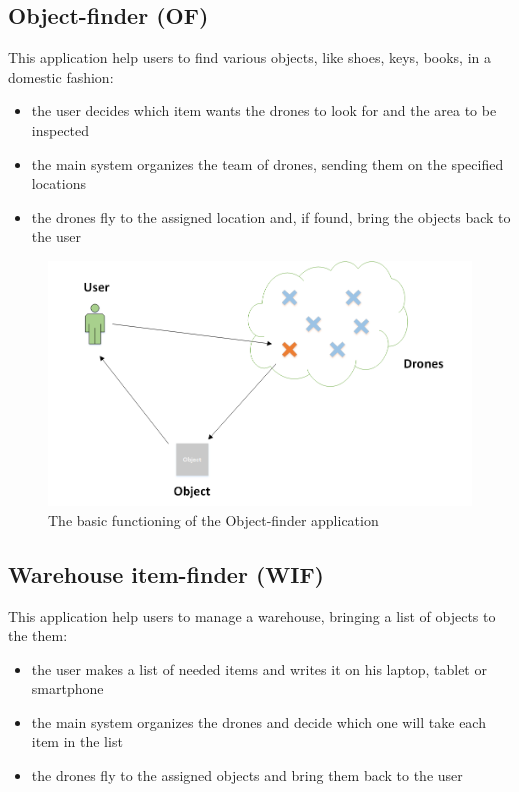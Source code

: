 \newpage

\subsection{Object-finder (OF)}

This application help users to find various objects, like shoes, keys, books, in a domestic fashion:

\begin{itemize}
\itemsep2pt
\item{
the user decides which item wants the drones to look for and the area to be inspected
}
\item{
the main system organizes the team of drones, sending them on the specified locations
}
\item{
the drones fly to the assigned location and, if found, bring the objects back to the user
}
\end{itemize}


\begin{figure}[H]
  \centering
  \includegraphics[width=\linewidth]{pictures/OF.png}
  \caption{The basic functioning of the Object-finder application}
  \label{fig:OF}
\end{figure}



\newpage

\subsection{Warehouse item-finder (WIF)}

This application help users to manage a warehouse, bringing a list of objects to the them:

\begin{itemize}
\itemsep2pt
\item{
the user makes a list of needed items and writes it on his laptop, tablet or smartphone}
\item{
the main system organizes the drones and decide which one will take each item in the list
}
\item{
the drones fly to the assigned objects and bring them back to the user
}

\end{itemize}


